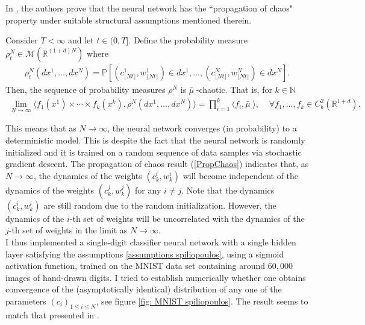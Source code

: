 \documentclass{article}
\theoremstyle{mystyle}
\newcommand{\bracket}[2]{\langle #1, #2\rangle}
\begin{document}
In \cite{sirignano2019meanfieldanalysislln}, the authors prove that the neural network has the  ``propagation of chaos" property under suitable structural assumptions mentioned therein.
\begin{theorem} \label{TheoremChaos}
Consider $T<\infty$ and let $t\in(0,T]$. Define the probability measure $\rho^N_t \in \mathcal{M} (\mathbb{R}^{(1+d)N})$ where
\begin{eqnarray*}
\rho^N_t(dx^1, \ldots, dx^N) = \mathbb{P}\left[ (c_{\lfloor N t \rfloor} ^1, w_{\lfloor N t \rfloor}^1) \in dx^1, \ldots, (c_{\lfloor N t \rfloor}^N, w_{\lfloor N t \rfloor}^N) \in dx^N \right].
\end{eqnarray*}
Then, the sequence of probability measures $\rho^N_\cdot$ is $\bar \mu_\cdot$-chaotic. That is, for $k\in\mathbb{N}$
\begin{eqnarray}
	\displaystyle\lim_{N \rightarrow \infty } \bracket{f_1(x^1) \times \cdots \times f_k(x^k)}{\rho_\cdot^N(dx^1, \ldots, dx^N)} = \prod_{i=1}^k \bracket{f_i}{\bar \mu_{\cdot}}, \phantom{....} \forall f_1, \ldots, f_k \in C^{2}_{b}(\mathbb{R}^{1+d}).
\label{PropChaos}
\end{eqnarray}

\end{theorem}

This means that as $N \rightarrow \infty$, the neural network converges (in probability) to a deterministic model. This is despite the fact that the neural network is randomly initialized and it is trained on a random sequence of data samples via stochastic gradient descent.
The propagation of chaos result (\ref{PropChaos}) indicates that, as $N \rightarrow \infty$, the dynamics of the weights $(c^i_k, w^i_k)$ will become independent of the dynamics of the weights $(c^j_k, w^j_k)$ for any $i \neq j$. Note that the dynamics $(c^i_k, w^i_k)$ are still random due to the random initialization. However, the dynamics of the $i$-th set of weights will be uncorrelated with the dynamics of the $j$-th set of weights in the limit as $N\rightarrow\infty$.\\ 

I thus implemented a single-digit classifier neural network with a single hidden layer satisfying the assumptions \ref{assumptions spiliopoulos},   using a sigmoid activation function, trained on the MNIST data set containing around $60,000$ images of hand-drawn digits. I tried to establish numerically whether one obtains convergence of the (asymptotically identical) distribution of any one of the parameters $ (c_{i})_{1\leq i\leq N}$, see figure \ref{fig: MNIST spiliopoulos}. The result seems to match that presented in \cite{sirignano2019meanfieldanalysislln}. 
\end{document}
